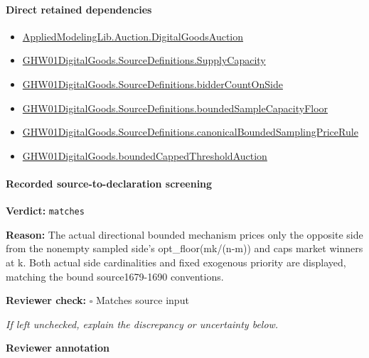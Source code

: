 \documentclass[10pt]{article}
\newcommand{\reviewerbox}{%
  \par\noindent\fbox{\parbox{0.96\linewidth}{\rule{0pt}{0.38in}}}\par
}
\newcommand{\reviewmatch}[1]{%
  \par\noindent\textbf{Reviewer check:} $\square$\; #1\par
  \noindent\emph{If left unchecked, explain the discrepancy or uncertainty below.}\par
}
\begin{document}
\paragraph{Direct retained dependencies}
\begin{itemize}\raggedright
\item \hyperlink{governing-declaration-7d5372964da104c4}{Applied\allowbreak{}Modeling\allowbreak{}Lib.\allowbreak{}Auction.\allowbreak{}Digital\allowbreak{}Goods\allowbreak{}Auction}
\item \hyperlink{governing-declaration-b45673e2f2fa9536}{GHW01\allowbreak{}Digital\allowbreak{}Goods.\allowbreak{}Source\allowbreak{}Definitions.\allowbreak{}Supply\allowbreak{}Capacity}
\item \hyperlink{governing-declaration-a18dc99f3222b9f7}{GHW01\allowbreak{}Digital\allowbreak{}Goods.\allowbreak{}Source\allowbreak{}Definitions.\allowbreak{}bidder\allowbreak{}Count\allowbreak{}On\allowbreak{}Side}
\item \hyperlink{governing-declaration-a5a8390db6af7c86}{GHW01\allowbreak{}Digital\allowbreak{}Goods.\allowbreak{}Source\allowbreak{}Definitions.\allowbreak{}bounded\allowbreak{}Sample\allowbreak{}Capacity\allowbreak{}Floor}
\item \hyperlink{governing-declaration-b29228cce64e93de}{GHW01\allowbreak{}Digital\allowbreak{}Goods.\allowbreak{}Source\allowbreak{}Definitions.\allowbreak{}canonical\allowbreak{}Bounded\allowbreak{}Sampling\allowbreak{}Price\allowbreak{}Rule}
\item \hyperlink{governing-declaration-fc35ccf8e8a39c61}{GHW01\allowbreak{}Digital\allowbreak{}Goods.\allowbreak{}bounded\allowbreak{}Capped\allowbreak{}Threshold\allowbreak{}Auction}
\end{itemize}
\paragraph{Recorded source-to-declaration screening}
\textbf{Verdict:} \texttt{matches}
\\
{\raggedright
\textbf{Reason:} The actual directional bounded mechanism prices only the opposite side from the nonempty sampled side's opt\_\allowbreak{}floor(mk/\allowbreak{}(n-\allowbreak{}m)) and caps market winners at k.\allowbreak{} Both actual side cardinalities and fixed exogenous priority are displayed, matching the bound source1679-\allowbreak{}1690 conventions.\allowbreak{}
\par}
\reviewmatch{Matches source input}
\noindent\textbf{Reviewer annotation}\par
\reviewerbox
\clearpage
\hypertarget{paper-prerequisite-480441cec34ea91d}{}
\end{document}
